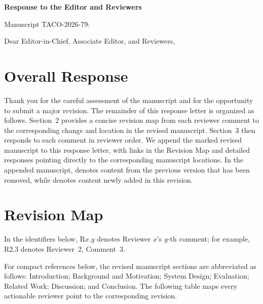\hypersetup{pageanchor=false}
\pagestyle{plain}
\renewcommand{\theHsection}{response.\arabic{section}}
\renewcommand{\theHsubsection}{response.\arabic{section}.\arabic{subsection}}
\renewcommand{\theHsubsubsection}{%
  response.\arabic{section}.\arabic{subsection}.\arabic{subsubsection}}
\renewcommand{\theHfigure}{response.\arabic{figure}}
\renewcommand{\theHtable}{response.\arabic{table}}
\renewcommand{\theHequation}{response.\arabic{equation}}

\begin{center}
  {\LARGE\bfseries Response to the Editor and Reviewers\par}
  \vspace{0.6em}
  {\large Manuscript TACO-2026-79:\par}
\end{center}
\vspace{1em}

\noindent Dear Editor-in-Chief, Associate Editor, and Reviewers,

\section{Overall Response}
\label{sec:overall-response}

Thank you for the careful assessment of the manuscript and for the
opportunity to submit a major revision.  The remainder of this response letter
is organized as follows.  Section~2 provides a concise revision map from each
reviewer comment to the corresponding change and location in the revised
manuscript.  Section~3 then responds to each comment in reviewer order.  We
append the marked revised manuscript to this response letter, with links in the
Revision Map and detailed responses pointing directly to the corresponding
manuscript locations.  In the appended manuscript,  denotes content
from the previous version that has been removed, while  denotes
content newly added in this revision.

\section{Revision Map}

In the identifiers below, R$x$.$y$ denotes Reviewer $x$'s $y$-th comment; for
example, R2.3 denotes Reviewer~2, Comment~3.

For compact references below, the revised manuscript sections are abbreviated
as follows: \SIntro{} Introduction; \SBG{} Background and Motivation;
\SDesign{} System Design; \SEval{} Evaluation; \SRelated{} Related Work;
\SDiscussion{} Discussion; and \SConclusion{} Conclusion.  The following table
maps every actionable reviewer point to the corresponding revision.

